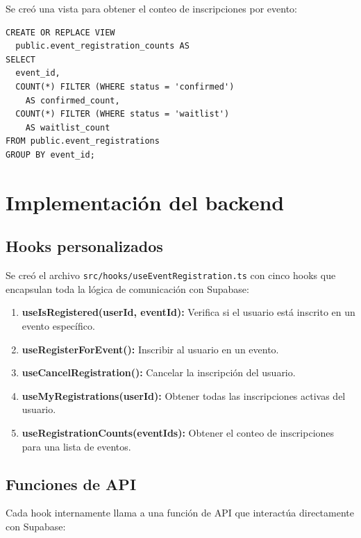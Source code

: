 \documentclass[12pt,letterpaper]{article}
\begin{document}
Se cre\'o una vista para obtener el conteo de inscripciones por evento:

\begin{verbatim}
CREATE OR REPLACE VIEW
  public.event_registration_counts AS
SELECT
  event_id,
  COUNT(*) FILTER (WHERE status = 'confirmed')
    AS confirmed_count,
  COUNT(*) FILTER (WHERE status = 'waitlist')
    AS waitlist_count
FROM public.event_registrations
GROUP BY event_id;
\end{verbatim}

\section{Implementaci\'on del backend}

\subsection{Hooks personalizados}

Se cre\'o el archivo \texttt{src/hooks/useEventRegistration.ts} con
cinco hooks que encapsulan toda la l\'ogica de comunicaci\'on con
Supabase:

\begin{enumerate}
  \item \textbf{useIsRegistered(userId, eventId):} Verifica si el
    usuario est\'a inscrito en un evento espec\'ifico.
  \item \textbf{useRegisterForEvent():} Inscribir al usuario en un
    evento.
  \item \textbf{useCancelRegistration():} Cancelar la inscripci\'on
    del usuario.
  \item \textbf{useMyRegistrations(userId):} Obtener todas las
    inscripciones activas del usuario.
  \item \textbf{useRegistrationCounts(eventIds):} Obtener el conteo
    de inscripciones para una lista de eventos.
\end{enumerate}

\subsection{Funciones de API}

Cada hook internamente llama a una funci\'on de API que interact\'ua
directamente con Supabase:
\end{document}
